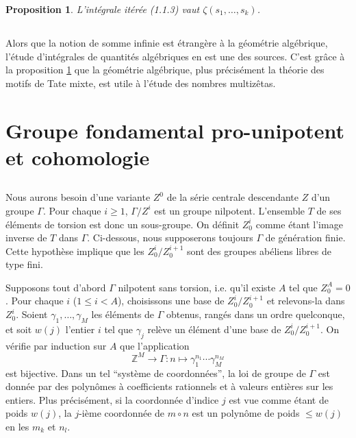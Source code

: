 \documentclass[11pt,a4paper]{article}
\theoremstyle{plain}
\newtheorem{proposition}[theorem]{Proposition}
\theoremstyle{definition}
\newcommand{\Z}{\mathbb{Z}}
\begin{document}
\begin{proposition}\label{prop:1.2}
L'int\'egrale it\'er\'ee (1.1.3) vaut $\zeta(s_1,\ldots,s_k)$.
\end{proposition}

\subsection{}\label{ssec:1.3}

Alors que la notion de somme infinie est \'etrang\`ere \`a la g\'eom\'etrie alg\'ebrique, l'\'etude d'int\'egrales de quantit\'es alg\'ebriques en est une des sources. C'est gr\^ace \`a la proposition \ref{prop:1.2} que la g\'eom\'etrie alg\'ebrique, plus pr\'ecis\'ement la th\'eorie des motifs de Tate mixte, est utile \`a l'\'etude des nombres multiz\^etas.

\section{Groupe fondamental pro-unipotent et cohomologie}\label{sec:2}

\subsection{}\label{ssec:2.1}

Nous aurons besoin d'une variante $Z^0$ de la s\'erie centrale descendante $Z$ d'un groupe $\Gamma$. Pour chaque $i \geq 1$, $\Gamma/Z^i$ est un groupe nilpotent. L'ensemble $T$ de ses \'el\'ements de torsion est donc un sous-groupe. On d\'efinit $Z^i_0$ comme \'etant l'image inverse de $T$ dans $\Gamma$. Ci-dessous, nous supposerons toujours $\Gamma$ de g\'en\'eration finie. Cette hypoth\`ese implique que les $Z^i_0/Z^{i+1}_0$ sont des groupes ab\'eliens libres de type fini.

Supposons tout d'abord $\Gamma$ nilpotent sans torsion, i.e. qu'il existe $A$ tel que $Z^A_0 = 0$. Pour chaque $i$ ($1 \leq i < A$), choisissons une base de $Z^i_0/Z^{i+1}_0$ et relevons-la dans $Z^i_0$. Soient $\gamma_1,\ldots,\gamma_M$ les \'el\'ements de $\Gamma$ obtenus, rang\'es dans un ordre quelconque, et soit $w(j)$ l'entier $i$ tel que $\gamma_j$ rel\`eve un \'el\'ement d'une base de $Z^i_0/Z^{i+1}_0$. On v\'erifie par induction sur $A$ que l'application
\[
\Z^M \to \Gamma : n \mapsto \gamma_1^{n_1} \cdots \gamma_M^{n_M}
\]
est bijective. Dans un tel ``syst\`eme de coordonn\'ees'', la loi de groupe de $\Gamma$ est donn\'ee par des polyn\^omes \`a coefficients rationnels et \`a valeurs enti\`eres sur les entiers. Plus pr\'ecis\'ement, si la coordonn\'ee d'indice $j$ est vue comme \'etant de poids $w(j)$, la $j$-i\`eme coordonn\'ee de $m \circ n$ est un polyn\^ome de poids $\leq w(j)$ en les $m_k$ et $n_l$.
\end{document}
